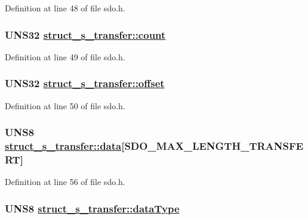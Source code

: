 Definition at line 48 of file sdo.h.\hypertarget{structstruct__s__transfer_42a6d8e63916bf2b2d1649995f8f0e11}{
\subsubsection[count]{\setlength{\rightskip}{0pt plus 5cm}UNS32 \hyperlink{structstruct__s__transfer_42a6d8e63916bf2b2d1649995f8f0e11}{struct\_\-s\_\-transfer::count}}}
\label{structstruct__s__transfer_42a6d8e63916bf2b2d1649995f8f0e11}




Definition at line 49 of file sdo.h.\hypertarget{structstruct__s__transfer_f29303b809a05773a5333fb079c59ff7}{
\subsubsection[offset]{\setlength{\rightskip}{0pt plus 5cm}UNS32 \hyperlink{structstruct__s__transfer_f29303b809a05773a5333fb079c59ff7}{struct\_\-s\_\-transfer::offset}}}
\label{structstruct__s__transfer_f29303b809a05773a5333fb079c59ff7}




Definition at line 50 of file sdo.h.\hypertarget{structstruct__s__transfer_b907a54e35126b8e267f546699e1df25}{
\subsubsection[data]{\setlength{\rightskip}{0pt plus 5cm}UNS8 \hyperlink{structstruct__s__transfer_b907a54e35126b8e267f546699e1df25}{struct\_\-s\_\-transfer::data}\mbox{[}SDO\_\-MAX\_\-LENGTH\_\-TRANSFERT\mbox{]}}}
\label{structstruct__s__transfer_b907a54e35126b8e267f546699e1df25}




Definition at line 56 of file sdo.h.\hypertarget{structstruct__s__transfer_bac6b366cfcddb5e7d64f6bf2eb97d74}{
\subsubsection[dataType]{\setlength{\rightskip}{0pt plus 5cm}UNS8 \hyperlink{structstruct__s__transfer_bac6b366cfcddb5e7d64f6bf2eb97d74}{struct\_\-s\_\-transfer::data\-Type}}}
\label{structstruct__s__transfer_bac6b366cfcddb5e7d64f6bf2eb97d74}




